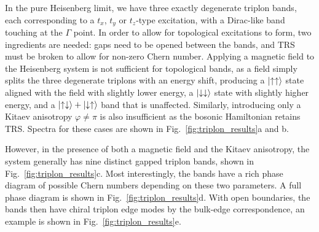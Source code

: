 In the pure Heisenberg limit, we have three exactly degenerate triplon bands, each corresponding to a $t_x$, $t_y$ or $t_z$-type excitation, with a Dirac-like band touching at the $\Gamma$ point. In order to allow for topological excitations to form, two ingredients are needed: gaps need to be opened between the bands, and TRS must be broken to allow for non-zero Chern number. Applying a magnetic field to the Heisenberg system is not sufficient for topological bands, as a field simply splits the three degenerate triplons with an energy shift, producing a $\ket {\uparrow \uparrow}$ state aligned with the field with slightly lower energy, a $\ket {\downarrow \downarrow}$ state with slightly higher energy, and a $\ket{\uparrow \downarrow}+\ket{\downarrow \uparrow}$ band that is unaffected. Similarly, introducing only a Kitaev anisotropy $\varphi \neq \pi$ is also insufficient as the bosonic Hamiltonian retains TRS. Spectra for these cases are shown in Fig.~\ref{fig:triplon_results}a and b.

However, in the presence of both a magnetic field and the Kitaev anisotropy, the system generally has nine distinct gapped triplon bands, shown in Fig.~\ref{fig:triplon_results}c. Most interestingly, the bands have a rich phase diagram of possible Chern numbers depending on these two parameters. A full phase diagram is shown in Fig.~\ref{fig:triplon_results}d. With open boundaries, the bands then have chiral triplon edge modes by the bulk-edge correspondence, an example is shown in Fig.~\ref{fig:triplon_results}e.